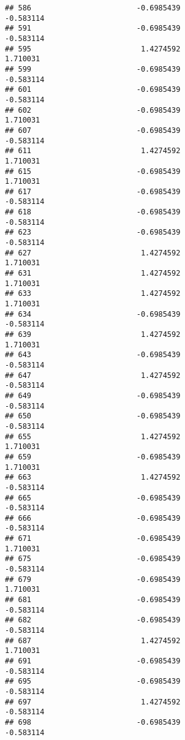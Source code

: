 \documentclass[
]{article}
\begin{document}
\begin{verbatim}
## 586                        -0.6985439                        -0.583114
## 591                        -0.6985439                        -0.583114
## 595                         1.4274592                         1.710031
## 599                        -0.6985439                        -0.583114
## 601                        -0.6985439                        -0.583114
## 602                        -0.6985439                         1.710031
## 607                        -0.6985439                        -0.583114
## 611                         1.4274592                         1.710031
## 615                        -0.6985439                         1.710031
## 617                        -0.6985439                        -0.583114
## 618                        -0.6985439                        -0.583114
## 623                        -0.6985439                        -0.583114
## 627                         1.4274592                         1.710031
## 631                         1.4274592                         1.710031
## 633                         1.4274592                         1.710031
## 634                        -0.6985439                        -0.583114
## 639                         1.4274592                         1.710031
## 643                        -0.6985439                        -0.583114
## 647                         1.4274592                        -0.583114
## 649                        -0.6985439                        -0.583114
## 650                        -0.6985439                        -0.583114
## 655                         1.4274592                         1.710031
## 659                        -0.6985439                         1.710031
## 663                         1.4274592                        -0.583114
## 665                        -0.6985439                        -0.583114
## 666                        -0.6985439                        -0.583114
## 671                        -0.6985439                         1.710031
## 675                        -0.6985439                        -0.583114
## 679                        -0.6985439                         1.710031
## 681                        -0.6985439                        -0.583114
## 682                        -0.6985439                        -0.583114
## 687                         1.4274592                         1.710031
## 691                        -0.6985439                        -0.583114
## 695                        -0.6985439                        -0.583114
## 697                         1.4274592                        -0.583114
## 698                        -0.6985439                        -0.583114

\end{verbatim}
\end{document}
